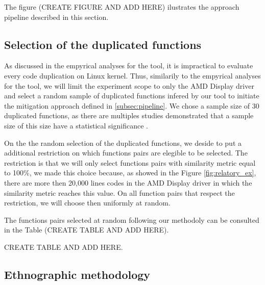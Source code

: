 The figure (CREATE FIGURE AND ADD HERE) ilustrates the approach pipeline described in this section.

\subsection{Selection of the duplicated functions}

As discussed in the empyrical analyses for the tool, it is impractical to evaluate every code duplication on Linux kernel. Thus,
similarily to the empyrical analyses for the tool, we will limit the experiment scope to only the AMD Display driver and select
a random sample of duplicated functions infered by our tool to initiate the mitigation approach defined in \ref{subsec:pipeline}. 
We chose a sample size of 30 duplicated functions, as there are multiples studies demonstrated that a sample size of this size 
have a statistical significance \citep{sample1,sample2}.

On the the random selection of the duplicated functions, we deside to put a additional restriction on which functions pairs are 
elegible to be selected. The restriction is that we will only select functions pairs with similarity metric equal 
to 100\%, we made this choice because, as showed in the Figure \ref{fig:relatory_ex}, there are more then 20,000 lines codes 
in the AMD Display driver in which the similarity metric reaches this value. On all function pairs that respect the restriction,
we will choose then uniformly at random.

The functions pairs selected at random following our methodoly can be consulted in the Table (CREATE TABLE AND ADD HERE).

CREATE TABLE AND ADD HERE.

\subsection{Ethnographic methodology}




